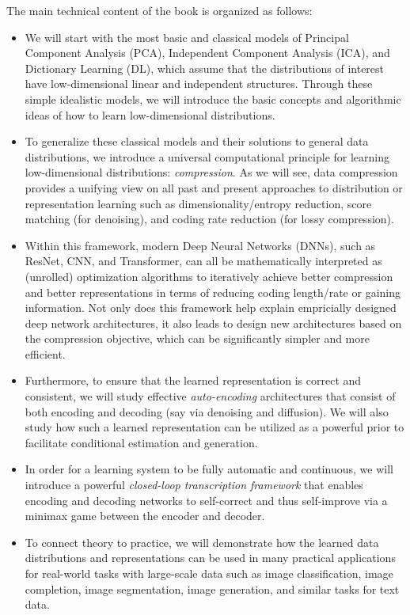 \documentclass[../../book-main.tex]{subfiles}
\begin{document}
The main technical content of the book is organized as follows:
\begin{itemize}
\item We will start with the most basic and classical models of Principal Component Analysis (PCA), Independent Component Analysis (ICA), and Dictionary Learning (DL), which assume that the distributions of interest have low-dimensional linear and independent structures. Through these simple idealistic models, we will introduce the basic concepts and algorithmic ideas of how to learn low-dimensional distributions.

\item To generalize these classical models and their solutions to general data distributions, we introduce a universal computational principle for learning low-dimensional distributions: {\em compression}. As we will see, data compression provides a unifying view on all past and present approaches to distribution or representation learning such as dimensionality/entropy reduction, score matching (for denoising), and coding rate reduction (for lossy compression). 

\item Within this framework, modern Deep Neural Networks (DNNs), such as ResNet, CNN, and Transformer, can all be mathematically interpreted as (unrolled) optimization algorithms to iteratively achieve better compression and better representations in terms of reducing coding length/rate or gaining information. Not only does this framework help explain empricially designed deep network architectures, it also leads to design new architectures based on the compression objective, which can be significantly simpler and more efficient.

\item Furthermore, to ensure that the learned representation is correct and consistent, we will study effective {\em auto-encoding} architectures that consist of both encoding and decoding (say via denoising and diffusion). We will also study how such a learned representation can be utilized as a powerful prior to facilitate conditional estimation and generation. 

\item In order for a learning system to be fully automatic and continuous, we will introduce a powerful {\em closed-loop transcription framework} that enables encoding and decoding networks to self-correct and thus self-improve via a minimax game between the encoder and decoder. 

\item To connect theory to practice, we will demonstrate how the learned data distributions and representations can be used in many practical applications for real-world tasks with large-scale data such as image classification, image completion, image segmentation, image generation, and similar tasks for text data. 
\end{itemize}
\end{document}

